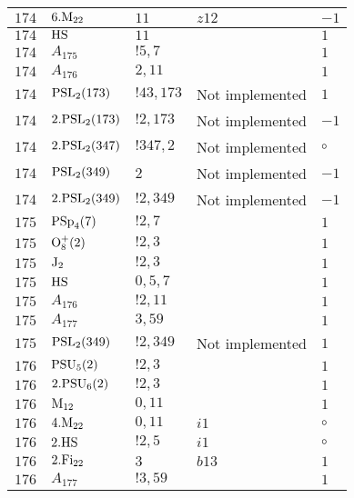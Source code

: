 \documentclass[a4paper, 11pt]{article}
\begin{document}
\begin{longtable}{lllll}
        $ 174 $ & $ 6.{\rm M}_{22} $ & $ 11 $ & $ z12 $ & $ -1$ \\ \hline
        $ 174 $ & $ {\rm HS} $ & $ 11 $ & $ ~ $ & $ 1$ \\ \hline
        $ 174 $ & $ A_{175} $ & $ !5, 7 $ & $ ~ $ & $ 1$ \\ \hline
        $ 174 $ & $ A_{176} $ & $ 2, 11 $ & $ ~ $ & $ 1$ \\ \hline
        $ 174 $ & $ {\rm PSL}_{2}(173) $ & $ !43, 173 $ &  Not implemented & $ 1$ \\ \hline
        $ 174 $ & $ 2.{\rm PSL}_{2}(173) $ & $ !2, 173 $ &  Not implemented & $ -1$ \\ \hline
        $ 174 $ & $ 2.{\rm PSL}_{2}(347) $ & $ !347, 2 $ &  Not implemented &  $\circ$ \\ \hline
        $ 174 $ & $ {\rm PSL}_{2}(349) $ & $ 2 $ &  Not implemented & $ -1$ \\ \hline
        $ 174 $ & $ 2.{\rm PSL}_{2}(349) $ & $ !2, 349 $ &  Not implemented & $ -1$ \\ \hline
        $ 175 $ & $ {\rm PSp}_{4}(7) $ & $ ! 2,7 $ & $ ~ $ & $ 1$ \\ \hline
        $ 175 $ & $ {\rm O}_{8}^+(2) $ & $ ! 2,3 $ & $ ~ $ & $ 1$ \\ \hline
        $ 175 $ & $ {\rm J}_2 $ & $ ! 2,3 $ & $ ~ $ & $ 1$ \\ \hline
        $ 175 $ & $ {\rm HS} $ & $ 0,5,7 $ & $ ~ $ & $ 1$ \\ \hline
        $ 175 $ & $ A_{176} $ & $ !2, 11 $ & $ ~ $ & $ 1$ \\ \hline
        $ 175 $ & $ A_{177} $ & $ 3, 59 $ & $ ~ $ & $ 1$ \\ \hline
        $ 175 $ & $ {\rm PSL}_{2}(349) $ & $ !2, 349 $ &  Not implemented & $ 1$ \\ \hline
        $ 176 $ & $ {\rm PSU}_{5}(2) $ & $ ! 2,3 $ & $ ~ $ & $ 1$ \\ \hline
        $ 176 $ & $ 2.{\rm PSU}_{6}(2) $ & $ ! 2,3 $ & $ ~ $ & $ 1$ \\ \hline
        $ 176 $ & $ {\rm M}_{12} $ & $ 0,11 $ & $ ~ $ & $ 1$ \\ \hline
        $ 176 $ & $ 4.{\rm M}_{22} $ & $ 0,11 $ & $ i1 $ &  $\circ$ \\ \hline
        $ 176 $ & $ 2.{\rm HS} $ & $ ! 2,5 $ & $ i1 $ &  $\circ$ \\ \hline
        $ 176 $ & $ 2.{\rm Fi}_{22} $ & $ 3 $ & $ b13 $ & $ 1$ \\ \hline
        $ 176 $ & $ A_{177} $ & $ !3, 59 $ & $ ~ $ & $ 1$ \\ \hline

\end{longtable}
\end{document}
